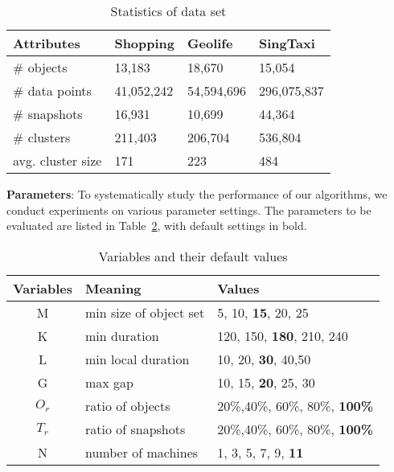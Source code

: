 \begin{table} [h]
\center
\small
\begin{tabular}{|l|l|l|l|}
\hline
 \textbf{Attributes}& \textbf{Shopping} &  \textbf{Geolife} &  \textbf{SingTaxi} \\ 
\hline 
\# objects  & 13,183 & 18,670 & 15,054\\ 
\hline
\# data points  & 41,052,242 & 54,594,696 & 296,075,837\\ 
\hline
\# snapshots  & 16,931 & 10,699 & 44,364\\ 
\hline
\# clusters  & 211,403  & 206,704& 536,804\\
\hline
avg. cluster size  & 171 & 223 & 484\\
\hline
\end{tabular}
\caption{Statistics of data set}
\label{exp:dataset}
\end{table}

\textbf{Parameters}: To systematically study the performance of
our algorithms, we conduct experiments on various parameter settings. The parameters to be evaluated are listed in Table~\ref{tbl:parameters}, with default settings in bold. 
\begin{table}[h]
\small
\begin{tabular}{c|l|l}
\hline 
\textbf{Variables} & \textbf{Meaning} & \textbf{Values} \\ 
\hline 
M & min size of object set &  5, 10,  \textbf{15}, 20, 25 \\ 
\hline 
K & min duration & 120, 150, \textbf{180}, 210, 240 \\ 
\hline 
L & min local duration & 10, 20, \textbf{30}, 40,50 \\ 
\hline 
G & max gap & 10, 15, \textbf{20}, 25, 30 \\ 
\hline
$O_r$ & ratio of objects & 20\%,40\%, 60\%, 80\%, \textbf{100\%} \\ \hline
$T_r$ & ratio of snapshots & 20\%,40\%, 60\%, 80\%, \textbf{100\%} \\ \hline
N & number of machines & 1, 3, 5, 7, 9, \textbf{11}\\ 
\hline 
\end{tabular} 
\caption{Variables and their default values}
\label{tbl:parameters}
\end{table}




